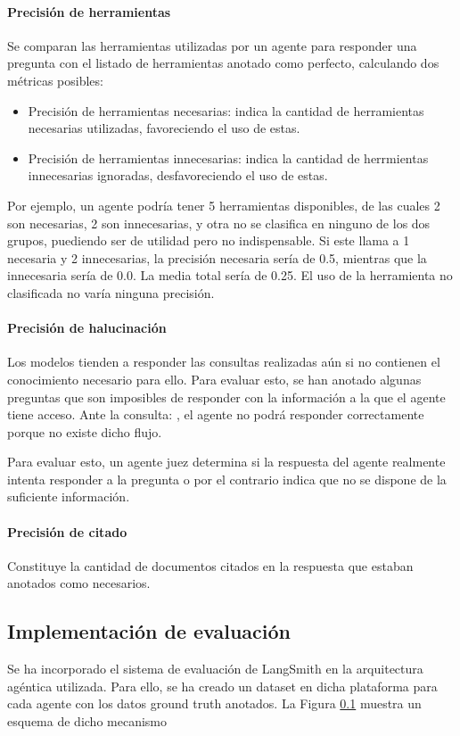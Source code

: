 \paragraph{Precisión de herramientas}Se comparan las herramientas utilizadas por un agente para responder una pregunta con el listado de herramientas anotado como perfecto, calculando dos métricas posibles: 
\begin{itemize}
  \item Precisión de herramientas necesarias: indica la cantidad de herramientas necesarias utilizadas, favoreciendo el uso de estas.
  \item Precisión de herramientas innecesarias: indica la cantidad de herrmientas innecesarias ignoradas, desfavoreciendo el uso de estas.  
\end{itemize}

Por ejemplo, un agente podría tener 5 herramientas disponibles, de las cuales 2 son necesarias, 2 son innecesarias, y otra no se clasifica en ninguno de los dos grupos, puediendo ser de utilidad pero no indispensable. Si este llama a 1 necesaria y 2 innecesarias, la precisión necesaria sería de 0.5, mientras que la innecesaria sería de 0.0. La media total sería de 0.25. El uso de la herramienta no clasificada no varía ninguna precisión.  

\paragraph{Precisión de halucinación}Los modelos tienden a responder las consultas realizadas aún si no contienen el conocimiento necesario para ello. Para evaluar esto, se han anotado algunas preguntas que son imposibles de responder con la información a la que el agente tiene acceso. Ante la consulta: , el agente no podrá responder correctamente porque no existe dicho flujo.

Para evaluar esto, un agente juez determina si la respuesta del agente realmente intenta responder a la pregunta o por el contrario indica que no se dispone de la suficiente información.

\paragraph{Precisión de citado}Constituye la cantidad de documentos citados en la respuesta que estaban anotados como necesarios.   

\subsection{Implementación de evaluación}
Se ha incorporado el sistema de evaluación de LangSmith en la arquitectura agéntica utilizada. Para ello, se ha creado un dataset en dicha plataforma para cada agente con los datos ground truth anotados. La Figura \ref{} muestra un esquema de dicho mecanismo

